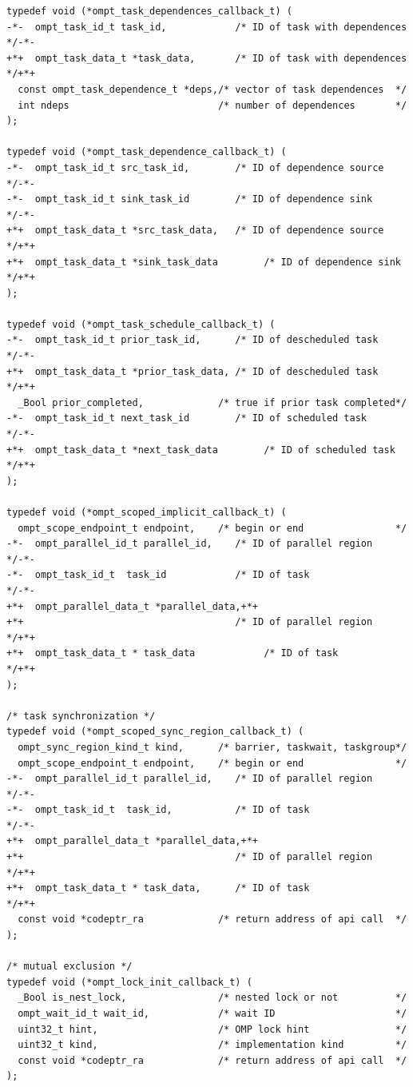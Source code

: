 \documentclass{article}
\begin{document}
\begin{lstlisting}
typedef void (*ompt_task_dependences_callback_t) (                                   
-*-  ompt_task_id_t task_id,            /* ID of task with dependences */-*-
+*+  ompt_task_data_t *task_data,       /* ID of task with dependences */+*+
  const ompt_task_dependence_t *deps,/* vector of task dependences  */
  int ndeps                          /* number of dependences       */
);

typedef void (*ompt_task_dependence_callback_t) (
-*-  ompt_task_id_t src_task_id,        /* ID of dependence source     */-*-
-*-  ompt_task_id_t sink_task_id        /* ID of dependence sink       */-*-
+*+  ompt_task_data_t *src_task_data,   /* ID of dependence source     */+*+
+*+  ompt_task_data_t *sink_task_data        /* ID of dependence sink       */+*+
);

typedef void (*ompt_task_schedule_callback_t) (
-*-  ompt_task_id_t prior_task_id,      /* ID of descheduled task      */-*-
+*+  ompt_task_data_t *prior_task_data, /* ID of descheduled task      */+*+
  _Bool prior_completed,             /* true if prior task completed*/
-*-  ompt_task_id_t next_task_id        /* ID of scheduled task        */-*-
+*+  ompt_task_data_t *next_task_data        /* ID of scheduled task        */+*+
);

typedef void (*ompt_scoped_implicit_callback_t) ( 
  ompt_scope_endpoint_t endpoint,    /* begin or end                */
-*-  ompt_parallel_id_t parallel_id,    /* ID of parallel region       */-*-
-*-  ompt_task_id_t  task_id            /* ID of task                  */-*-
+*+  ompt_parallel_data_t *parallel_data,+*+
+*+                                     /* ID of parallel region       */+*+
+*+  ompt_task_data_t * task_data            /* ID of task                  */+*+
);

/* task synchronization */
typedef void (*ompt_scoped_sync_region_callback_t) ( 
  ompt_sync_region_kind_t kind,      /* barrier, taskwait, taskgroup*/
  ompt_scope_endpoint_t endpoint,    /* begin or end                */ 
-*-  ompt_parallel_id_t parallel_id,    /* ID of parallel region       */-*-
-*-  ompt_task_id_t  task_id,           /* ID of task                  */-*-
+*+  ompt_parallel_data_t *parallel_data,+*+
+*+                                     /* ID of parallel region       */+*+
+*+  ompt_task_data_t * task_data,      /* ID of task                  */+*+
  const void *codeptr_ra             /* return address of api call  */
);

/* mutual exclusion */
typedef void (*ompt_lock_init_callback_t) (
  _Bool is_nest_lock,                /* nested lock or not          */
  ompt_wait_id_t wait_id,            /* wait ID                     */
  uint32_t hint,                     /* OMP lock hint               */
  uint32_t kind,                     /* implementation kind         */
  const void *codeptr_ra             /* return address of api call  */
);


\end{lstlisting}
\end{document}
